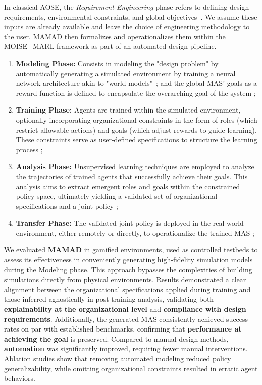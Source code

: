 \documentclass[journal]{IEEEtai}
\begin{document}
In classical AOSE, the \textit{Requirement Engineering} phase refers to defining design requirements, environmental constraints, and global objectives~\cite{Pavon2003, Bernon2005}. We assume these inputs are already available and leave the choice of engineering methodology to the user. MAMAD then formalizes and operationalizes them within the MOISE+MARL framework as part of an automated design pipeline.

\begin{enumerate}
  \item \textbf{Modeling Phase:} Consists in modeling the "design problem" by automatically generating a simulated environment by training a neural network architecture akin to "world models"~\cite{Ha2018}; and the global MAS' goals as a reward function is defined to encapsulate the overarching goal of the system ;
  \item \textbf{Training Phase:} Agents are trained within the simulated environment, optionally incorporating organizational constraints in the form of roles (which restrict allowable actions) and goals (which adjust rewards to guide learning). These constraints serve as user-defined specifications to structure the learning process ;
  \item \textbf{Analysis Phase:} Unsupervised learning techniques are employed to analyze the trajectories of trained agents that successfully achieve their goals. This analysis aims to extract emergent roles and goals within the constrained policy space, ultimately yielding a validated set of organizational specifications and a joint policy ;
  \item \textbf{Transfer Phase:} The validated joint policy is deployed in the real-world environment, either remotely or directly, to operationalize the trained MAS ;
\end{enumerate}

We evaluated \textbf{MAMAD} in gamified environments, used as controlled testbeds to assess its effectiveness in conveniently generating high-fidelity simulation models during the Modeling phase. This approach bypasses the complexities of building simulations directly from physical environments.
Results demonstrated a clear alignment between the organizational specifications applied during training and those inferred agnostically in post-training analysis, validating both \textbf{explainability at the organizational level} and \textbf{compliance with design requirements}. Additionally, the generated MAS consistently achieved success rates on par with established benchmarks, confirming that \textbf{performance at achieving the goal} is preserved. Compared to manual design methods, \textbf{automation} was significantly improved, requiring fewer manual interventions. Ablation studies show that removing automated modeling reduced policy generalizability, while omitting organizational constraints resulted in erratic agent behaviors.
\end{document}
